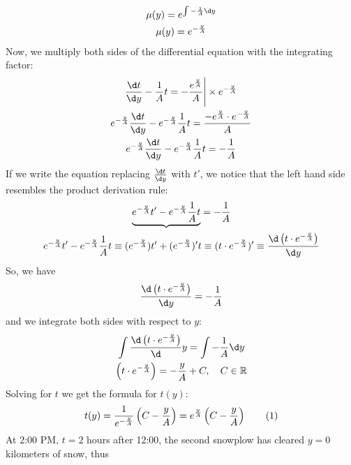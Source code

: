 \documentclass[a4paper,12pt]{article}
\newcommand\numberthis{\addtocounter{equation}{1}\tag{\theequation}}
\begin{document}
\begin{itemize}
\begin{gather*}
                \mu(y) = e^{\int -\frac{1}{A} \d y} \\
                \mu(y) = e^{-\frac{y}{A}}
            \end{gather*}
            Now, we multiply both sides of the differential equation with the integrating factor:
            \begin{gather*}
                \frac{\d t}{\d y} - \frac{1}{A}t = - \frac{e^{\frac{y}{A}}}{A} \Bigg| \times e^{-\frac{y}{A}} \\
                e^{-\frac{y}{A}} \frac{\d t}{\d y} - e^{-\frac{y}{A}} \frac{1}{A} t = \frac{-e^{\frac{y}{A}} \cdot e^{-\frac{y}{A}}}{A} \\
                e^{-\frac{y}{A}} \frac{\d t}{\d y} - e^{-\frac{y}{A}} \frac{1}{A} t = - \frac{1}{A}
            \end{gather*}
            If we write the equation replacing \(\frac{\d t}{\d y}\) with \(t'\), we notice that the left hand side resembles the product derivation rule:
            \begin{gather*}
                \underbrace{e^{-\frac{y}{A}} t' - e^{-\frac{y}{A}} \frac{1}{A} t} = - \frac{1}{A} \\
                e^{-\frac{y}{A}} t' - e^{-\frac{y}{A}} \frac{1}{A} t \equiv (e^{-\frac{y}{A}})t' + (e^{-\frac{y}{A}})'t \equiv (t \cdot e^{-\frac{y}{A}})' \equiv \frac{\d \left(t \cdot e^{-\frac{y}{A}}\right)}{\d y}
            \end{gather*}
            So, we have
            \begin{gather*}
                \frac{\d \left(t \cdot e^{-\frac{y}{A}}\right)}{\d y} = -\frac{1}{A}
            \end{gather*}
            and we integrate both sides with respect to \(y\):
            \begin{gather*}
                \int\frac{\d \left(t \cdot e^{-\frac{y}{A}}\right)} \d y = \int -\frac{1}{A} \d y \\
                \left(t \cdot e^{-\frac{y}{A}}\right) = -\frac{y}{A} + C, \quad C \in \mathbb{R}
            \end{gather*}
            Solving for \(t\) we get the formula for \(t(y)\):
            \begin{gather*}
                t(y) = \frac{1}{e^{-\frac{y}{A}}}\left(C-\frac{y}{A}\right) = e^\frac{y}{A}\left(C - \frac{y}{A}\right) \numberthis \label{eq:t(y)_initial}
            \end{gather*}
            At 2:00 PM, $t = 2$ hours after 12:00, the second snowplow has cleared $y = 0$ kilometers of snow, thus

\end{itemize}
\end{document}
